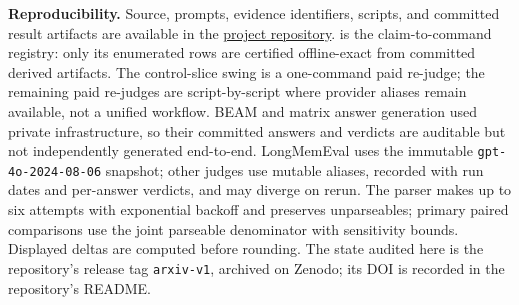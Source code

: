 \documentclass[11pt]{article}
\begin{document}
\textbf{Reproducibility.} Source, prompts, evidence identifiers, scripts, and committed result artifacts are available in the \href{https://github.com/mnemoverse/mnemoverse-benchmarks-paper}{project repository}.  is the claim-to-command registry: only its enumerated rows are certified offline-exact from committed derived artifacts. The control-slice swing is a one-command paid re-judge; the remaining paid re-judges are script-by-script where provider aliases remain available, not a unified workflow. BEAM and matrix answer generation used private infrastructure, so their committed answers and verdicts are auditable but not independently generated end-to-end. LongMemEval uses the immutable \texttt{gpt-4o-2024-08-06} snapshot; other judges use mutable aliases, recorded with run dates and per-answer verdicts, and may diverge on rerun. The parser makes up to six attempts with exponential backoff and preserves unparseables; primary paired comparisons use the joint parseable denominator with sensitivity bounds. Displayed deltas are computed before rounding. The state audited here is the repository's release tag \texttt{arxiv-v1}, archived on Zenodo; its DOI is recorded in the repository's README.

\setlength{\bibsep}{3pt plus 0.3ex}
{\footnotesize


}
\end{document}
